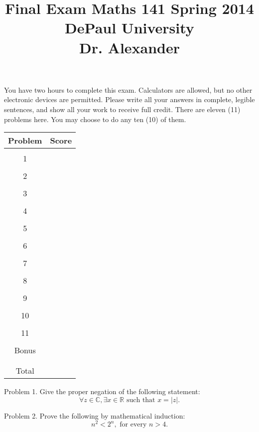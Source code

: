 \documentclass[16 pt]{amsart}
\theoremstyle{definition}
\theoremstyle{remark}
\numberwithin{equation}{subsection}
\newcommand{\R}{\mathbb{R}}
\newcommand{\C}{\mathbb{C}}
\begin{document}
\title{Final Exam Maths 141 Spring 2014 \\ DePaul University\\Dr. Alexander}
\maketitle
You have two hours to complete this exam.  Calculators are allowed, but no other electronic devices are permitted.  Please write all your answers in complete, legible sentences, and show all your work to receive full credit.  There are eleven (11) problems here.  You may choose to do any ten (10) of them.  
\vspace{1in}
\begin{center}
  \begin{tabular}{ c | c }
    Problem & Score\\
    \hline
    &\\
    1&\\
    &\\
    2&\\
    &\\
    3&\\
    &\\
    4&\\
    &\\
    5&\\
    &\\
    6&\\
    &\\
    7&\\
    &\\
    8&\\
    &\\
    9&\\
    &\\
    10&\\
    &\\
    11&\\
    &\\
    Bonus&\\
    &\\
    \hline 
    &\\    
    Total& 
 \end{tabular}
\end{center}



\newpage
Problem 1. Give the proper negation of the following statement:
\[
\forall z\in\C, \exists x\in\R \text{ such that } x = |z|.  
\]


\newpage
Problem 2. Prove the following by mathematical induction:
\[
n^2 < 2^n, \text{ for every } n>4.
\]
\end{document}
